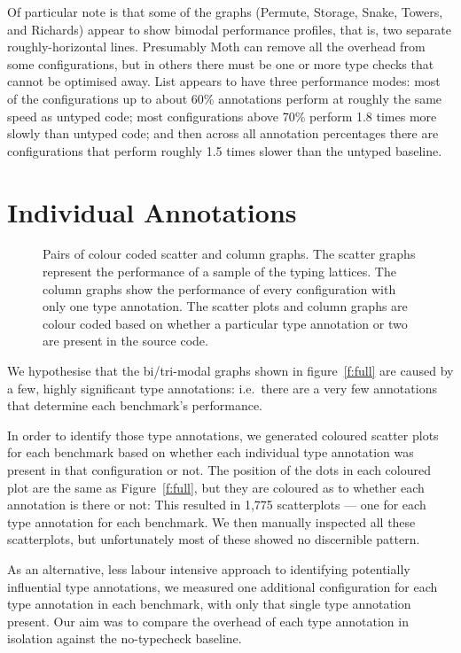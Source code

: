 \documentclass[sigplan,10pt,review,screen]{acmart}\settopmatter{printfolios=true}
\begin{document}
Of particular note is that some of the graphs (Permute, Storage, Snake, Towers, and Richards) appear to show bimodal performance profiles, that is, two separate roughly-horizontal lines. Presumably Moth can remove all the overhead from some configurations, but in others there must be one or more type checks that cannot be optimised away. List appears to have three performance modes: most of the configurations up to about 60\% annotations perform at roughly the same speed as untyped code; most configurations above 70\% perform 1.8 times more slowly than untyped code; and then across all annotation percentages there are configurations that perform roughly 1.5 times slower than the untyped baseline.



\section{Individual Annotations}
\label{s-individual}
\begin{figure*}
	
	\caption{Pairs of colour coded scatter and column graphs. The scatter graphs represent the performance of a sample of the typing lattices. The column graphs show the performance of every configuration with only one type annotation. The scatter plots and column graphs are colour coded based on whether a particular type annotation or two are present in the source code.}
	\label{f:pattern}		
\end{figure*}
We hypothesise that the bi/tri-modal graphs shown in figure~\ref{f:full} are caused by a few, highly significant type annotations: i.e.\ there are a very few annotations that determine each benchmark's performance.

In order to identify those type annotations, we generated coloured
scatter plots for each benchmark based on whether each individual type
annotation was present in that configuration or not. The position of
the dots in each coloured plot are the same as Figure~\ref{f:full}, but
they are coloured as to whether each annotation is there or not: This resulted in 1,775 scatterplots --- one for each type annotation for each benchmark. 
We then manually inspected all these scatterplots,
but unfortunately most of these showed no discernible pattern.


As an alternative, less labour intensive approach to identifying
potentially influential type annotations, we measured one additional
configuration for each type annotation in each benchmark, with only
that single type annotation present. Our aim was to compare the overhead of
each type annotation in isolation against the no-typecheck baseline.
\end{document}
